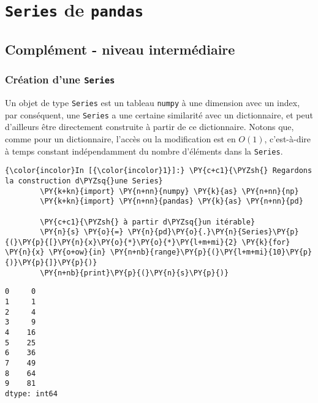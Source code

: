     
    
    
    

    

    \hypertarget{series-de-pandas}{%
\section{\texorpdfstring{\texttt{Series} de
\texttt{pandas}}{Series de pandas}}\label{series-de-pandas}}

    \hypertarget{compluxe9ment---niveau-intermuxe9diaire}{%
\subsection{Complément - niveau
intermédiaire}\label{compluxe9ment---niveau-intermuxe9diaire}}

    \hypertarget{cruxe9ation-dune-series}{%
\subsubsection{\texorpdfstring{Création d'une
\texttt{Series}}{Création d'une Series}}\label{cruxe9ation-dune-series}}

    Un objet de type \texttt{Series} est un tableau \texttt{numpy} à une
dimension avec un index, par conséquent, une \texttt{Series} a une
certaine similarité avec un dictionnaire, et peut d'ailleurs être
directement construite à partir de ce dictionnaire. Notons que, comme
pour un dictionnaire, l'accès ou la modification est en \(O(1)\),
c'est-à-dire à temps constant indépendamment du nombre d'éléments dans
la \texttt{Series}.

    \begin{Verbatim}[commandchars=\\\{\},frame=single,framerule=0.3mm,rulecolor=\color{cellframecolor}]
{\color{incolor}In [{\color{incolor}1}]:} \PY{c+c1}{\PYZsh{} Regardons la construction d\PYZsq{}une Series}
        \PY{k+kn}{import} \PY{n+nn}{numpy} \PY{k}{as} \PY{n+nn}{np}
        \PY{k+kn}{import} \PY{n+nn}{pandas} \PY{k}{as} \PY{n+nn}{pd}
        
        \PY{c+c1}{\PYZsh{} à partir d\PYZsq{}un itérable}
        \PY{n}{s} \PY{o}{=} \PY{n}{pd}\PY{o}{.}\PY{n}{Series}\PY{p}{(}\PY{p}{[}\PY{n}{x}\PY{o}{*}\PY{o}{*}\PY{l+m+mi}{2} \PY{k}{for} \PY{n}{x} \PY{o+ow}{in} \PY{n+nb}{range}\PY{p}{(}\PY{l+m+mi}{10}\PY{p}{)}\PY{p}{]}\PY{p}{)}
        \PY{n+nb}{print}\PY{p}{(}\PY{n}{s}\PY{p}{)}
\end{Verbatim}


    \begin{Verbatim}[commandchars=\\\{\},frame=single,framerule=0.3mm,rulecolor=\color{cellframecolor}]
0     0
1     1
2     4
3     9
4    16
5    25
6    36
7    49
8    64
9    81
dtype: int64
\end{Verbatim}

